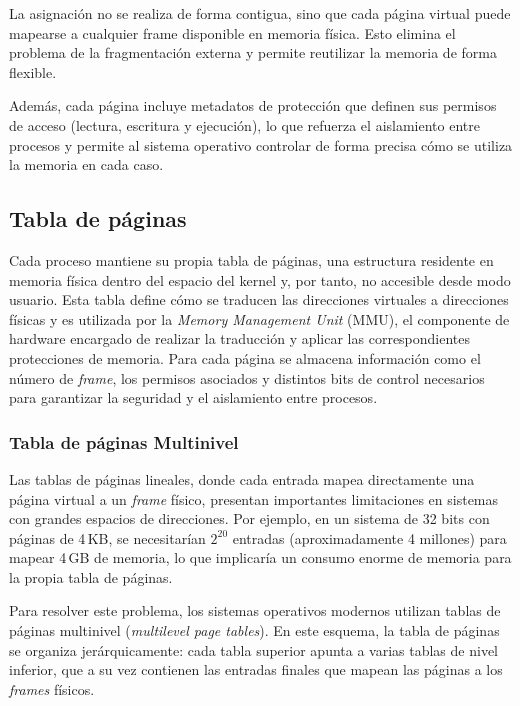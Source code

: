 La asignación no se realiza de forma contigua, sino que cada página virtual puede mapearse a cualquier frame disponible en memoria física. Esto elimina el problema de la fragmentación externa y permite reutilizar la memoria de forma flexible.

Además, cada página incluye metadatos de protección que definen sus permisos de acceso (lectura, escritura y ejecución), lo que refuerza el aislamiento entre procesos y permite al sistema operativo controlar de forma precisa cómo se utiliza la memoria en cada caso.

\subsection{Tabla de páginas}

Cada proceso mantiene su propia tabla de páginas, una estructura residente en memoria física dentro del espacio del kernel y, por tanto, no accesible desde modo usuario. Esta tabla define cómo se traducen las direcciones virtuales a direcciones físicas y es utilizada por la \textit{Memory Management Unit} (MMU), el componente de hardware encargado de realizar la traducción y aplicar las correspondientes protecciones de memoria. Para cada página se almacena información como el número de \textit{frame}, los permisos asociados y distintos bits de control necesarios para garantizar la seguridad y el aislamiento entre procesos.

\subsubsection{Tabla de páginas Multinivel}

Las tablas de páginas lineales, donde cada entrada mapea directamente una página virtual a un \textit{frame} físico, presentan importantes limitaciones en sistemas con grandes espacios de direcciones. Por ejemplo, en un sistema de 32 bits con páginas de 4\,KB, se necesitarían \(2^{20}\) entradas (aproximadamente 4 millones) para mapear 4\,GB de memoria, lo que implicaría un consumo enorme de memoria para la propia tabla de páginas.

Para resolver este problema, los sistemas operativos modernos utilizan tablas de páginas multinivel (\textit{multilevel page tables}). En este esquema, la tabla de páginas se organiza jerárquicamente: cada tabla superior apunta a varias tablas de nivel inferior, que a su vez contienen las entradas finales que mapean las páginas a los \textit{frames} físicos.  


